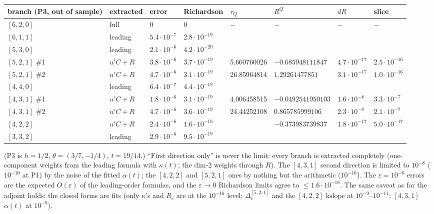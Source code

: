 \documentclass[10pt]{article}
\begin{document}
\begin{center}\footnotesize\setlength{\tabcolsep}{3pt}\begin{longtable}{@{}p{1.9cm}p{1.6cm}p{1.2cm}p{1.9cm}p{1.7cm}p{2.5cm}p{1.4cm}p{1.4cm}@{}}\toprule
\textbf{branch (P3, out of sample)} & \textbf{extracted} & \textbf{error} & \textbf{Richardson} & \textbf{$\tau_Q$} & \textbf{$R^Q$} & \textbf{$dR$} & \textbf{slice} \\\midrule\endhead
$[6,2,0]$ & full & 0 & 0 & $-$ & $-$ & $-$ & $-$ \\
$[6,1,1]$ & leading & $5.4\cdot10^{-7}$ & $2.8\cdot10^{-19}$ &  &  &  &  \\
$[5,3,0]$ & leading & $2.1\cdot10^{-6}$ & $4.2\cdot10^{-20}$ &  &  &  &  \\
$[5,2,1]$ \#1 & $u'C+R$ & $3.8\cdot10^{-6}$ & $3.7\cdot10^{-19}$ & 5.660760026 & $-0.685948111847$ & $4.7\cdot10^{-17}$ & $2.5\cdot10^{-16}$ \\
$[5,2,1]$ \#2 & $u'C+R$ & $4.7\cdot10^{-6}$ & $3.1\cdot10^{-19}$ & 26.85964814 & $1.29261477851$ & $3.1\cdot10^{-17}$ & $1.0\cdot10^{-16}$ \\
$[4,4,0]$ & leading & $6.4\cdot10^{-7}$ & $4.4\cdot10^{-19}$ &  &  &  &  \\
$[4,3,1]$ \#1 & $u'C+R$ & $1.8\cdot10^{-6}$ & $3.1\cdot10^{-19}$ & 4.006458515 & $-0.0492541950103$ & $1.6\cdot10^{-8}$ & $3.3\cdot10^{-7}$ \\
$[4,3,1]$ \#2 & $u'C+R$ & $4.7\cdot10^{-6}$ & $3.6\cdot10^{-19}$ & 24.44252108 & $0.865785999106$ & $2.3\cdot10^{-8}$ & $2.1\cdot10^{-7}$ \\
$[4,2,2]$ & $u'C+R$ & $2.4\cdot10^{-6}$ & $1.6\cdot10^{-18}$ &  & $-0.373983739837$ & $1.8\cdot10^{-17}$ & $5.0\cdot10^{-17}$ \\
$[3,3,2]$ & leading & $2.9\cdot10^{-6}$ & $9.5\cdot10^{-19}$ &  &  &  &  \\
\bottomrule\end{longtable}\end{center}

(P3 is $h=1/2$, $\theta=(3/7,-1/4)$, $t=19/14$.) ``First direction only'' is never the limit: every branch is extracted completely (one-component weights from the leading formula with $\kappa(t)$; the dim-2 weights through $R$). The $[4,3,1]$ second direction is limited to $10^{-8}$ ($10^{-10}$ at P1) by the noise of the fitted $\alpha(t)$; the $[4,2,2]$ and $[5,2,1]$ ones by nothing but the arithmetic ($10^{-16}$). The $\varepsilon=10^{-6}$ errors are the expected $O(\varepsilon)$ of the leading-order formulas, and the $\varepsilon\to0$ Richardson limits agree to $\le1.6\cdot10^{-18}$. The same caveat as for the adjoint holds: the closed forms are fits (only $\kappa$'s and $R_c$ are at the $10^{-16}$ level; $\Delta_c^{[5,2,1]}$ and the $[4,2,2]$ $\mathrm{kslope}$ at $10^{-9}$--$10^{-11}$; $[4,3,1]$ $\alpha(t)$ at $10^{-9}$).
\end{document}
